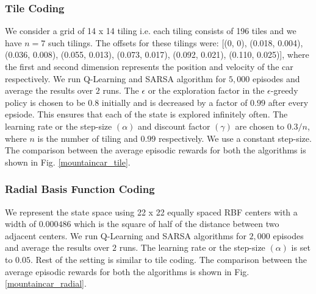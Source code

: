 \documentclass{article}
\begin{document}
        \subsubsection{Tile Coding}
        We consider a grid of 14 x 14 tiling i.e. each tiling consists of 196 tiles and we have $n=7$ such tilings. The offsets for these tilings were:
        [(0, 0), (0.018, 0.004), (0.036, 0.008), (0.055, 0.013), (0.073, 0.017), (0.092, 0.021), (0.110, 0.025)], where the first and second dimension represents 
        the position and velocity of the car respectively. We run Q-Learning and SARSA algorithm for $5,000$ episodes and 
        average the results over $2$ runs. The $\epsilon$ or the exploration factor in the $\epsilon$-greedy policy is chosen to be $0.8$ initially and is 
        decreased by a factor of $0.99$ after every epsiode. This ensures that each of the state is explored infinitely often. The learning rate or the step-size 
        $(\alpha)$ and discount factor $(\gamma)$ are chosen to $0.3/n$, where $n$ is the number of tiling and $0.99$ respectively. We use a constant step-size.
        The comparison between the average episodic rewards for both the algorithms is shown in Fig. \ref{mountaincar_tile}.

        \subsubsection{Radial Basis Function Coding}
        We represent the state space using 22 x 22 equally spaced RBF centers with a width of $0.000486$ which is the square of half of the distance between two 
        adjacent centers. We run Q-Learning and SARSA algorithms for $2,000$ episodes and average the results over $2$ runs. The learning rate or the step-size 
        $(\alpha)$ is set to $0.05$. Rest of the setting is similar to tile coding. The comparison between the average episodic rewards for both the algorithms 
        is shown in Fig. \ref{mountaincar_radial}.
\end{document}
